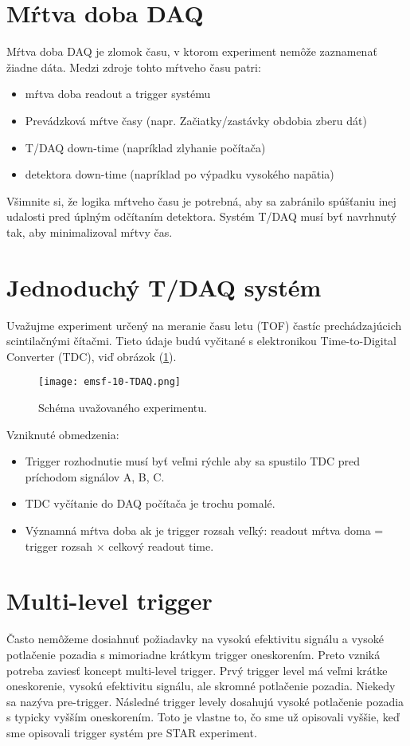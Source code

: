\documentclass[../../main.tex]{subfiles}
\begin{document}
\section{Mŕtva doba DAQ}
Mŕtva doba DAQ je zlomok času, v ktorom experiment nemôže zaznamenať žiadne dáta. Medzi zdroje tohto mŕtveho času patri:
\begin{itemize}
\item mŕtva doba readout a trigger systému
\item Prevádzková mŕtve časy (napr. Začiatky/zastávky obdobia zberu dát)
\item T/DAQ down-time (napríklad zlyhanie počítača)
\item detektora down-time (napríklad po výpadku vysokého napätia)
\end{itemize}
Všimnite si, že logika mŕtveho času je potrebná, aby sa zabránilo spúšťaniu inej udalosti pred úplným odčítaním detektora. Systém T/DAQ musí byť navrhnutý tak, aby minimalizoval mŕtvy čas.

\section{Jednoduchý T/DAQ systém}
Uvažujme experiment určený na meranie času letu (TOF) častíc prechádzajúcich scintilačnými čítačmi. Tieto údaje budú vyčitané s elektronikou Time-to-Digital Converter (TDC), viď obrázok (\ref{em10:fig:tdaq}).

\begin{figure}[!h]
\texttt{[image: emsf-10-TDAQ.png]}
\centering
\caption{Schéma uvažovaného experimentu.}
\label{em10:fig:tdaq}
\end{figure}

Vzniknuté obmedzenia:
\begin{itemize}
\item Trigger rozhodnutie musí byť veľmi rýchle aby sa spustilo TDC pred príchodom signálov A, B, C.
\item TDC vyčítanie do DAQ počítača je trochu pomalé.
\item Významná mŕtva doba ak je trigger rozsah veľký: readout mŕtva doma = trigger rozsah $\times$ celkový readout time.
\end{itemize}

\section{Multi-level trigger}
Často nemôžeme dosiahnuť požiadavky na vysokú efektivitu signálu a vysoké potlačenie pozadia s mimoriadne krátkym trigger oneskorením. Preto vzniká potreba zaviesť koncept multi-level trigger. Prvý trigger level má veľmi krátke oneskorenie, vysokú efektivitu signálu, ale skromné potlačenie pozadia. Niekedy sa nazýva pre-trigger. Následné trigger levely dosahujú vysoké potlačenie pozadia s typicky vyšším oneskorením. Toto je vlastne to, čo sme už opisovali vyššie, keď sme opisovali trigger systém pre STAR experiment.
\end{document}
